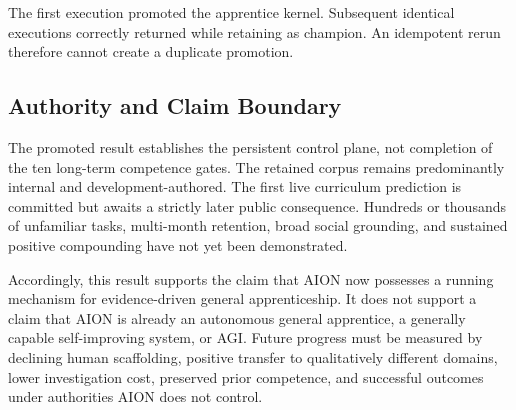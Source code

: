 The first execution promoted the apprentice kernel.  Subsequent identical
executions correctly returned  while retaining
 as champion.  An
idempotent rerun therefore cannot create a duplicate promotion.

\subsection{Authority and Claim Boundary}
\label{subsec:general-apprentice-claim-boundary}

The promoted result establishes the persistent control plane, not completion of
the ten long-term competence gates.  The retained corpus remains predominantly
internal and development-authored.  The first live curriculum prediction is
committed but awaits a strictly later public consequence.  Hundreds or
thousands of unfamiliar tasks, multi-month retention, broad social grounding,
and sustained positive compounding have not yet been demonstrated.

Accordingly, this result supports the claim that AION now possesses a running
mechanism for evidence-driven general apprenticeship.  It does not support a
claim that AION is already an autonomous general apprentice, a generally
capable self-improving system, or AGI.  Future progress must be measured by
declining human scaffolding, positive transfer to qualitatively different
domains, lower investigation cost, preserved prior competence, and successful
outcomes under authorities AION does not control.
